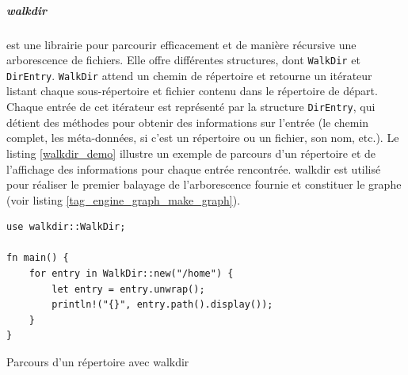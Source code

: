 \subparagraph{walkdir}
est une librairie pour parcourir efficacement et de manière récursive une arborescence de fichiers.
Elle offre différentes structures, dont \texttt{WalkDir} et \texttt{DirEntry}. 
\texttt{WalkDir} attend un chemin de répertoire et retourne un itérateur listant 
chaque sous-répertoire et fichier contenu dans le répertoire de départ. Chaque entrée de cet 
itérateur est représenté par la structure \texttt{DirEntry}, qui détient des méthodes 
pour obtenir des informations sur l'entrée (le chemin complet, les méta-données, si c'est un 
répertoire ou un fichier, son nom, etc.). Le listing \ref{walkdir_demo} illustre un exemple de 
parcours d'un répertoire et de l'affichage des informations pour chaque entrée rencontrée. 
walkdir est utilisé pour réaliser le premier balayage de l'arborescence 
fournie et constituer le graphe (voir listing \ref{tag_engine_graph_make_graph}).
\bigbreak
\begin{code}
    \begin{verbatim}
use walkdir::WalkDir;

fn main() {
    for entry in WalkDir::new("/home") {
        let entry = entry.unwrap();
        println!("{}", entry.path().display());
    }
}
    \end{verbatim}
    \caption{Parcours d'un répertoire avec walkdir}
    \label{walkdir_demo}
\end{code}

